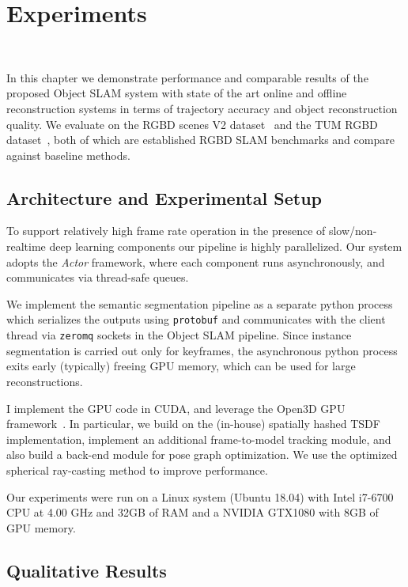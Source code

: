 \chapter{Experiments}~\label{chap:experiments}

In this chapter we demonstrate performance and comparable results of the proposed Object SLAM system with state of the art online and offline reconstruction systems in terms of trajectory accuracy and object reconstruction quality. We evaluate on the RGBD scenes V2 dataset~\cite{laiUnsupervisedFeatureLearning2014} and the TUM RGBD dataset~\cite{sturmBenchmarkEvaluationRGBD2012}, both of which are established RGBD SLAM benchmarks and compare against baseline methods.

\section{Architecture and Experimental Setup}


To support relatively high frame rate operation in the presence of slow/non-realtime deep learning components our pipeline is highly parallelized. Our system adopts the \textit{Actor} framework, where each component runs asynchronously, and communicates via thread-safe queues.

We implement the semantic segmentation pipeline as a separate python process which serializes the outputs using \texttt{protobuf} and communicates with the client thread via \texttt{zeromq} sockets in the Object SLAM pipeline. Since instance segmentation is carried out only for keyframes, the asynchronous python process exits early (typically) freeing GPU memory, which can be used for large reconstructions.

I implement the GPU code in CUDA, and leverage the Open3D GPU framework~\cite{dongGPUAcceleratedRobust2019}. In particular, we build on the (in-house) spatially hashed TSDF implementation, implement an additional frame-to-model tracking module, and also build a back-end module for pose graph optimization. We use the optimized spherical ray-casting method to improve performance.

Our experiments were run on a Linux system (Ubuntu 18.04) with Intel i7-6700 CPU at 4.00 GHz and 32GB of RAM and a NVIDIA GTX1080 with 8GB of GPU memory.

\section{Qualitative Results}

